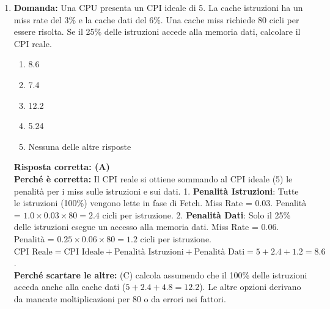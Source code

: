 \documentclass[12pt, a4paper]{article}
\begin{document}
\begin{enumerate}
    \item \textbf{Domanda:} Una CPU presenta un CPI ideale di 5. La cache istruzioni ha un miss rate del 3\% e la cache dati del 6\%. Una cache miss richiede 80 cicli per essere risolta. Se il 25\% delle istruzioni accede alla memoria dati, calcolare il CPI reale.
    \begin{enumerate}[label=(\Alph*)]
        \item 8.6
        \item 7.4
        \item 12.2
        \item 5.24
        \item Nessuna delle altre risposte
    \end{enumerate}
    \textbf{Risposta corretta: (A)} \\
    \textbf{Perché è corretta:} Il CPI reale si ottiene sommando al CPI ideale (5) le penalità per i miss sulle istruzioni e sui dati.
    1. \textbf{Penalità Istruzioni}: Tutte le istruzioni (100\%) vengono lette in fase di Fetch. Miss Rate = $0.03$. Penalità = $1.0 \times 0.03 \times 80 = 2.4$ cicli per istruzione.
    2. \textbf{Penalità Dati}: Solo il 25\% delle istruzioni esegue un accesso alla memoria dati. Miss Rate = $0.06$. Penalità = $0.25 \times 0.06 \times 80 = 1.2$ cicli per istruzione.
    $\text{CPI Reale} = \text{CPI Ideale} + \text{Penalità Istruzioni} + \text{Penalità Dati} = 5 + 2.4 + 1.2 = 8.6$. \\
    \textbf{Perché scartare le altre:} (C) calcola assumendo che il 100\% delle istruzioni acceda anche alla cache dati ($5 + 2.4 + 4.8 = 12.2$). Le altre opzioni derivano da mancate moltiplicazioni per 80 o da errori nei fattori.

\newpage



\end{enumerate}
\end{document}
